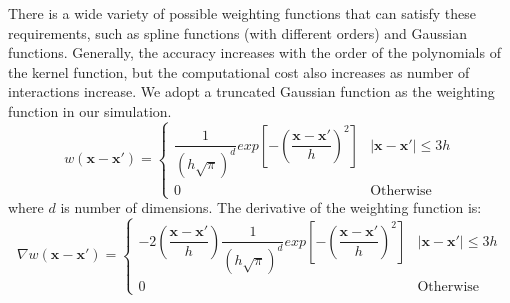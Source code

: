 There is a wide variety of possible weighting functions that can satisfy these requirements, such as spline functions (with different orders) and Gaussian functions. Generally, the accuracy increases with the order of the polynomials of the kernel function, but the computational cost also increases as number of interactions increase. 
We adopt a truncated Gaussian function as the weighting function in our simulation.
\begin{equation}
w\left(\textbf{x} - \textbf{x} \prime \right) = 
\begin{cases} 
      \dfrac{1}{\left(h \sqrt{\pi}\right)^d} exp \left[- \left(\dfrac{\textbf{x} - \textbf{x} \prime}{h} \right)^2 \right] &  \vert \textbf{x} - \textbf{x} \prime \vert \leq 3h\\
      0 & \text{Otherwise}
\end{cases}
\label{eq:SPH-kernel}
\end{equation}
where $d$ is number of dimensions.
The derivative of the weighting function is:
\begin{equation}
\nabla w\left(\textbf{x} - \textbf{x} \prime \right) = 
\begin{cases} 
      -2\left(\dfrac{\textbf{x} - \textbf{x} \prime}{h}\right) \dfrac{1}{\left(h \sqrt{\pi}\right)^d} exp \left[- \left(\dfrac{\textbf{x} - \textbf{x} \prime}{h}\right)^2 \right] &  \vert \textbf{x} - \textbf{x} \prime \vert \leq 3h\\
      0 & \text{Otherwise}
\end{cases}
\label{eq:SPH-kernel-gradient}
\end{equation}

